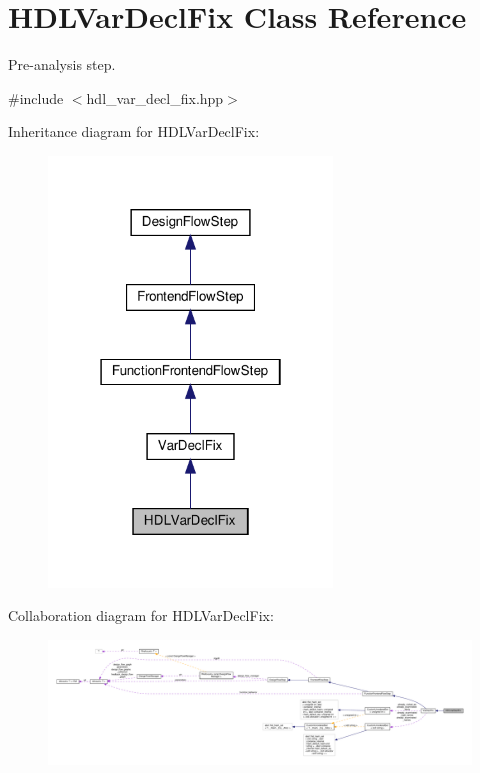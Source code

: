 \hypertarget{classHDLVarDeclFix}{}\section{H\+D\+L\+Var\+Decl\+Fix Class Reference}
\label{classHDLVarDeclFix}


Pre-\/analysis step.  




{\ttfamily \#include $<$hdl\+\_\+var\+\_\+decl\+\_\+fix.\+hpp$>$}



Inheritance diagram for H\+D\+L\+Var\+Decl\+Fix\+:
\nopagebreak
\begin{figure}[H]
\begin{center}
\leavevmode
\includegraphics[width=214pt]{d9/d2c/classHDLVarDeclFix__inherit__graph}
\end{center}
\end{figure}


Collaboration diagram for H\+D\+L\+Var\+Decl\+Fix\+:
\nopagebreak
\begin{figure}[H]
\begin{center}
\leavevmode
\includegraphics[width=350pt]{d1/d75/classHDLVarDeclFix__coll__graph}
\end{center}
\end{figure}
